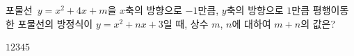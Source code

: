 포물선~$y=x^2+4x+m$을 $x$축의 방향으로 $-1$만큼, $y$축의 방향으로 $1$만큼 평행이동한 포물선의 방정식이 $y=x^2+nx+3$일 때, 상수 $m$, $n$에 대하여 $m+n$의 값은?
\begin{choices32}{$1$}{$2$}{$3$}{$4$}{$5$}\end{choices32}
